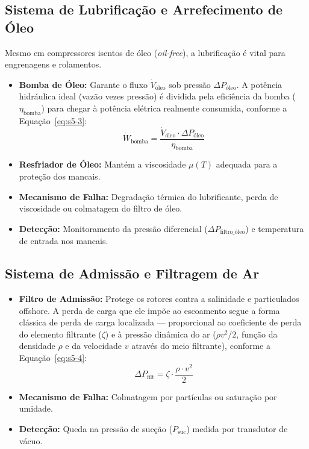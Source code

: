 \documentclass[12pt,a4paper]{article}
\numberwithin{equation}{section}
\numberwithin{table}{section}
\numberwithin{figure}{section}
\begin{document}
	\subsection{\textbf{Sistema de Lubrificação e Arrefecimento de Óleo}}
	Mesmo em compressores isentos de óleo (\textit{oil-free}), a lubrificação é vital para engrenagens e rolamentos.
	\begin{itemize}
		\item \textbf{Bomba de Óleo:} Garante o fluxo $\dot{V}_{\text{óleo}}$ sob pressão $\Delta P_{\text{óleo}}$. A potência hidráulica ideal (vazão vezes pressão) é dividida pela eficiência da bomba ($\eta_{\text{bomba}}$) para chegar à potência elétrica realmente consumida, conforme a Equação~\eqref{eq:s5-3}:
		\begin{equation}\label{eq:s5-3}
 \dot{W}_{\text{bomba}} = \frac{\dot{V}_{\text{óleo}} \cdot \Delta P_{\text{óleo}}}{\eta_{\text{bomba}}}
\end{equation}
		\item \textbf{Resfriador de Óleo:} Mantém a viscosidade $\mu(T)$ adequada para a proteção dos mancais.
		\item \textbf{Mecanismo de Falha:} Degradação térmica do lubrificante, perda de viscosidade ou colmatagem do filtro de óleo.
		\item \textbf{Detecção:} Monitoramento da pressão diferencial ($\Delta P_{\text{filtro\_óleo}}$) e temperatura de entrada nos mancais.
	\end{itemize}
	
	\subsection{\textbf{Sistema de Admissão e Filtragem de Ar}}
	\begin{itemize}
		\item \textbf{Filtro de Admissão:} Protege os rotores contra a salinidade e particulados offshore. A perda de carga que ele impõe ao escoamento segue a forma clássica de perda de carga localizada — proporcional ao coeficiente de perda do elemento filtrante ($\zeta$) e à pressão dinâmica do ar ($\rho v^2/2$, função da densidade $\rho$ e da velocidade $v$ através do meio filtrante), conforme a Equação~\eqref{eq:s5-4}:
		\begin{equation}\label{eq:s5-4}
 \Delta P_{\text{filt}} = \zeta \cdot \frac{\rho \cdot v^2}{2}
\end{equation}
		\item \textbf{Mecanismo de Falha:} Colmatagem por partículas ou saturação por umidade.
		\item \textbf{Detecção:} Queda na pressão de sucção ($P_{\text{suc}}$) medida por transdutor de vácuo.
	\end{itemize}
	
\end{document}
